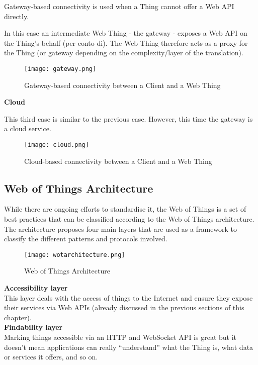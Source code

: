 Gateway-based connectivity is used when a Thing cannot offer a Web API
directly.

In this case an intermediate Web Thing - the gateway - exposes a Web API on the
Thing's behalf (per conto di).
The Web Thing therefore acts as a proxy for the Thing (or gateway depending on
the complexity/layer of the translation).

\begin{figure}[H]
  \centering
  \texttt{[image: gateway.png]}
  \caption{Gateway-based connectivity between a Client and a Web Thing}
  \label{fig:gateway}
\end{figure}

\textbf{Cloud}

This third case is similar to the previous case. However, this time the gateway
is a cloud service.

\begin{figure}[H]
  \centering
  \texttt{[image: cloud.png]}
  \caption{Cloud-based connectivity between a Client and a Web Thing}
  \label{fig:cloud}
\end{figure}

\subsection{Web of Things Architecture}

While there are ongoing efforts to standardise it, the Web of Things is a set 
of best practices that can be classified according to the Web of Things
architecture.
The architecture proposes four main layers that are used as a framework to
classify the different patterns and protocols involved.

\begin{figure}[H]
  \centering
  \texttt{[image: wotarchitecture.png]}
  \caption{Web of Things Architecture}
  \label{fig:wotarchitecture}
\end{figure}

\textbf{Accessibility layer}\\

This layer deals with the access of things to the
Internet and ensure they expose their services via Web APIs
(already discussed in the previous sections of this chapter).\\

\textbf{Findability layer}\\

Marking things accessible via an HTTP and WebSocket API is great but it doesn't
mean applications can really  ``understand'' what the Thing is, what data or
services it offers, and so on.

